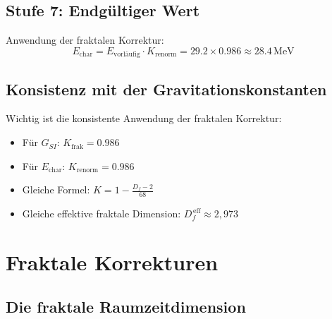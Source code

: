 	\subsection{Stufe 7: Endgültiger Wert}
	
	Anwendung der fraktalen Korrektur:
	\begin{equation}
		E_{\text{char}} = E_{\text{vorläufig}} \cdot K_{\text{renorm}} = 29.2 \times 0.986 \approx 28.4\,\text{MeV}
	\end{equation}
	
	\subsection{Konsistenz mit der Gravitationskonstanten}
	
	Wichtig ist die konsistente Anwendung der fraktalen Korrektur:
	\begin{itemize}
		\item Für $G_{SI}$: $K_{\text{frak}} = 0.986$
		\item Für $E_{\text{char}}$: $K_{\text{renorm}} = 0.986$
		\item Gleiche Formel: $K = 1 - \frac{D_f - 2}{68}$
		\item Gleiche effektive fraktale Dimension: $D_f^{\,\text{eff}} \approx 2{,}973$
	\end{itemize}
	
	\section{Fraktale Korrekturen}
	
	\subsection{Die fraktale Raumzeitdimension}
	
